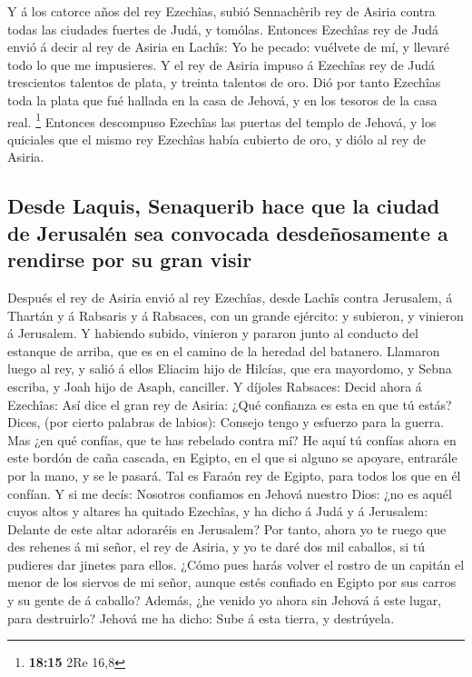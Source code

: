  Y á los catorce años del rey Ezechîas, subió Sennachêrib
rey de Asiria contra todas las ciudades fuertes de Judá, y tomólas.
 Entonces Ezechîas rey de Judá envió á decir al rey de
Asiria en Lachîs: Yo he pecado: vuélvete de mí, y llevaré todo lo que me
impusieres. Y el rey de Asiria impuso á Ezechîas rey de Judá trescientos
talentos de plata, y treinta talentos de oro.  Dió por
tanto Ezechîas toda la plata que fué hallada en la casa de Jehová, y en
los tesoros de la casa real. \footnote{\textbf{18:15} 2Re 16,8}
 Entonces descompuso Ezechîas las puertas del templo de
Jehová, y los quiciales que el mismo rey Ezechîas había cubierto de oro,
y diólo al rey de Asiria.

\hypertarget{desde-laquis-senaquerib-hace-que-la-ciudad-de-jerusaluxe9n-sea-convocada-desdeuxf1osamente-a-rendirse-por-su-gran-visir}{%
\subsection{Desde Laquis, Senaquerib hace que la ciudad de Jerusalén sea
convocada desdeñosamente a rendirse por su gran
visir}\label{desde-laquis-senaquerib-hace-que-la-ciudad-de-jerusaluxe9n-sea-convocada-desdeuxf1osamente-a-rendirse-por-su-gran-visir}}

 Después el rey de Asiria envió al rey Ezechîas, desde
Lachîs contra Jerusalem, á Thartán y á Rabsaris y á Rabsaces, con un
grande ejército: y subieron, y vinieron á Jerusalem. Y habiendo subido,
vinieron y pararon junto al conducto del estanque de arriba, que es en
el camino de la heredad del batanero.  Llamaron luego al
rey, y salió á ellos Eliacim hijo de Hilcías, que era mayordomo, y Sebna
escriba, y Joah hijo de Asaph, canciller.  Y díjoles
Rabsaces: Decid ahora á Ezechîas: Así dice el gran rey de Asiria: ¿Qué
confianza es esta en que tú estás?  Dices, (por cierto
palabras de labios): Consejo tengo y esfuerzo para la guerra. Mas ¿en
qué confías, que te has rebelado contra mí?  He aquí tú
confías ahora en este bordón de caña cascada, en Egipto, en el que si
alguno se apoyare, entrarále por la mano, y se le pasará. Tal es Faraón
rey de Egipto, para todos los que en él confían.  Y si me
decís: Nosotros confiamos en Jehová nuestro Dios: ¿no es aquél cuyos
altos y altares ha quitado Ezechîas, y ha dicho á Judá y á Jerusalem:
Delante de este altar adoraréis en Jerusalem?  Por tanto,
ahora yo te ruego que des rehenes á mi señor, el rey de Asiria, y yo te
daré dos mil caballos, si tú pudieres dar jinetes para ellos.
 ¿Cómo pues harás volver el rostro de un capitán el menor
de los siervos de mi señor, aunque estés confiado en Egipto por sus
carros y su gente de á caballo?  Además, ¿he venido yo
ahora sin Jehová á este lugar, para destruirlo? Jehová me ha dicho: Sube
á esta tierra, y destrúyela.

